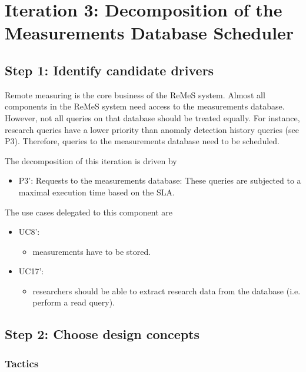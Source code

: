 \section{Iteration 3: Decomposition of the Measurements Database Scheduler}
\label{add:it3}

\subsection{Step 1: Identify candidate drivers}
\label{add:it3/drivers}

\npar Remote measuring is the core business of the ReMeS system. Almost all
components in the ReMeS system need access to the measurements database.
However, not all queries on that database should be treated equally. For
instance, research queries have a lower priority than anomaly detection history
queries (see P3). Therefore, queries to the measurements database need to be
scheduled.

\npar The decomposition of this iteration is driven by

\begin{itemize}
	\item P3': Requests to the measurements database: These queries are subjected
	to a maximal execution time based on the SLA. 
\end{itemize}

\npar The use cases delegated to this component are

\begin{itemize}
  \item UC8':
  \begin{itemize}
  	\item measurements have to be stored.
  \end{itemize}
  \item UC17': 
  \begin{itemize}
  	\item researchers should be able to extract research data from the database
  	(i.e. perform a read query).
  \end{itemize}

\end{itemize}

\subsection{Step 2: Choose design concepts}
\label{add:it3/concepts}

\subsubsection{Tactics}
\label{add:it3/tactics}

